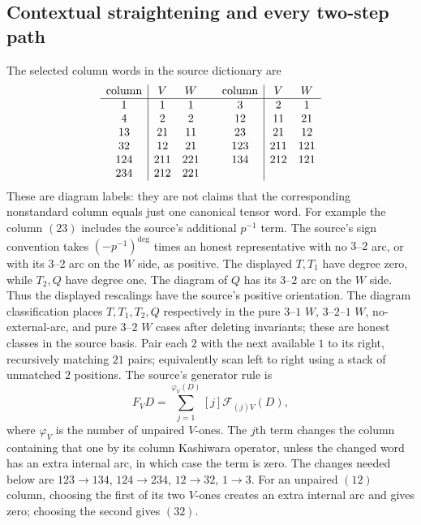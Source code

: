 \subsection{Contextual straightening and every two-step path}

The selected column words in the source dictionary are
\[
\begin{array}{c|cc@{\qquad}c|cc}
\text{column}&V&W&\text{column}&V&W\\\hline
1&1&1&3&2&1\\4&2&2&12&11&21\\
13&21&11&23&21&12\\32&12&21&123&211&121\\
124&211&221&134&212&121\\234&212&221&&&
\end{array}
\]
These are diagram labels: they are not claims that the corresponding
nonstandard column equals just one canonical tensor word. For example
the column $(23)$ includes the source's additional $p^{-1}$ term.
The source's sign convention takes $(-p^{-1})^{\deg}$ times an
honest representative with no $3$--$2$ arc, or with its $3$--$2$
arc on the $W$ side, as positive. The displayed $T,T_1$ have degree
zero, while $T_2,Q$ have degree one. The diagram of $Q$ has its
$3$--$2$ arc on the $W$ side. Thus the displayed rescalings have
the source's positive orientation. The diagram classification places
$T,T_1,T_2,Q$ respectively in the pure $3$--$1$ $W$, $3$--$2$--$1$
$W$, no-external-arc, and pure $3$--$2$ $W$ cases after deleting
invariants; these are honest classes in the source basis.
Pair each $2$ with the next available $1$ to its right, recursively
matching $21$ pairs; equivalently scan left to right using a stack
of unmatched $2$ positions. The source's generator rule is
\[
 F_VD=\sum_{j=1}^{\varphi_V(D)}[j]\mathcal F_{(j)V}(D),
\]
where $\varphi_V$ is the number of unpaired $V$-ones. The $j$th term
changes the column containing that one by its column Kashiwara
operator, unless the changed word has an extra internal arc, in
which case the term is zero. The changes needed below are
$123\to134$, $124\to234$, $12\to32$, $1\to3$.
For an unpaired $(12)$ column, choosing the first of its two
$V$-ones creates an extra internal arc and gives zero; choosing
the second gives $(32)$.

